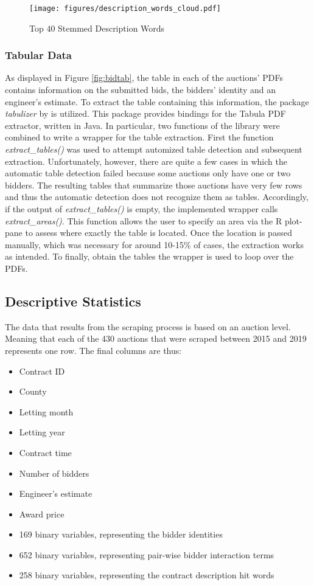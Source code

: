 \documentclass[a4paper,12pt, headsepline]{scrartcl}
\numberwithin{equation}{section}
\begin{document}
\begin{figure}[H]
	\texttt{[image: figures/description\_words\_cloud.pdf]}
	\caption{Top 40 Stemmed Description Words}\label{fig:desc}
\end{figure}

\subsubsection{Tabular Data}\label{subsec:tab}

As displayed in Figure \ref{fig:bidtab}, the table in each of the auctions' PDFs contains information on the submitted bids, the bidders' identity and an engineer's estimate. To extract the table containing this information, the package \textit{tabulizer} by \citet{tabulizer} is utilized. This package provides bindings for the Tabula PDF extractor, written in Java. In particular, two functions of the library were combined to write a wrapper for the table extraction. First the function \textit{extract\_tables()} was used to attempt automized table detection and subsequent extraction. Unfortunately, however, there are quite a few cases in which the automatic table detection failed because some auctions only have one or two bidders. The resulting tables that summarize those auctions have very few rows and thus the automatic detection does not recognize them as tables. Accordingly, if the output of \textit{extract\_tables()} is empty, the implemented wrapper calls \textit{extract\_areas()}. This function allows the user to specify an area via the R plot-pane to assess where exactly the table is located. Once the location is passed manually, which was necessary for around 10-15\% of cases, the extraction works as intended. To finally, obtain the tables the wrapper is used to loop over the PDFs.

\subsection{Descriptive Statistics}\label{subsec:desc}
The data that results from the scraping process is based on an auction level. Meaning that each of the 430 auctions that were scraped between 2015 and 2019 represents one row. The final columns are thus:

\begin{itemize}
	\item Contract ID
	\item County
	\item Letting month
	\item Letting year
	\item Contract time
	\item Number of bidders
	\item Engineer's estimate
	\item Award price
	\item 169 binary variables, representing the bidder identities
	\item 652 binary variables, representing pair-wise bidder interaction terms 
	\item 258 binary variables, representing the contract description hit words
\end{itemize}
\end{document}
